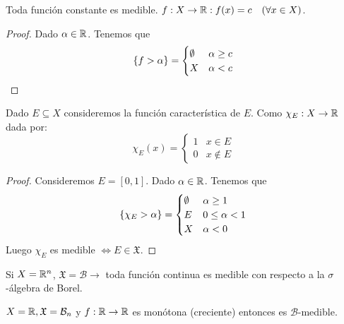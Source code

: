 \begin{eg}
    Toda función constante es medible. $f: X \to \mathbb{R} : f(x) = c \quad (\forall x \in X)$.
    \begin{proof}
        Dado $\alpha \in \mathbb{R}$. Tenemos que \begin{equation}
            \{ f > \alpha \} = \begin{cases}
                \emptyset & \alpha \geq c \\
                X  & \alpha < c
            \end{cases}
        \end{equation}
    \end{proof}
\end{eg}

\begin{eg}
    Dado $E \subseteq X$ consideremos la función característica de $E$. Como $\chi_E: X \to \mathbb{R}$ dada por:
    \begin{equation}
        \chi_E(x) = \begin{cases}
            1 & x \in E    \\
            0 & x \notin E
        \end{cases}
    \end{equation}
    \begin{proof}
        Consideremos $E = [0, 1]$. Dado $\alpha \in \mathbb{R}$. Tenemos que \begin{equation}
            \{ \chi_E > \alpha \} = \begin{cases}
                \emptyset & \alpha \geq 1     \\
                E  & 0 \leq \alpha < 1 \\
                X  & \alpha < 0
            \end{cases}
        \end{equation}
        Luego $\chi_E$ es medible $\iff E \in \mathfrak{X}$.
    \end{proof}
\end{eg}

\begin{eg}
    Si $X = \mathbb{R}^n$, $\mathfrak{X} = \mathcal{B} \to$ toda función continua es medible con respecto a la $\sigma$-álgebra de Borel.
\end{eg}

\begin{eg}
    $X = \mathbb{R}, \mathfrak{X} = \mathcal{B}_n$ y $f: \mathbb{R} \to \mathbb{R}$ es monótona (creciente) entonces es $\mathcal{B}$-medible.
\end{eg}

